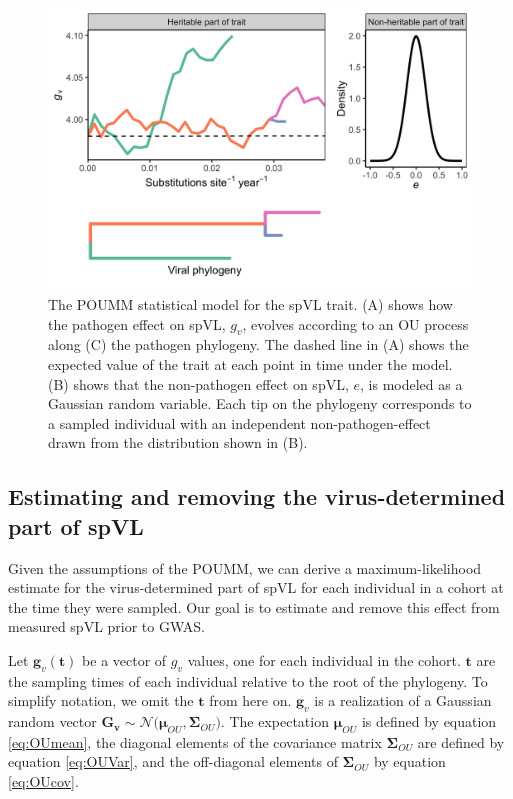 \documentclass[]{article}
\begin{document}
\begin{doublespace}
\begin{figure}[H]
	\begin{center}
		\includegraphics[width=0.75\linewidth]{figures/model_figure}
		\caption{The POUMM statistical model for the spVL trait. (A) shows how the pathogen effect on spVL, $g_v$, evolves according to an OU process along (C) the pathogen phylogeny. The dashed line in (A) shows the expected value of the trait at each point in time under the model. (B) shows that the non-pathogen effect on spVL, $e$, is modeled as a Gaussian random variable. Each tip on the phylogeny corresponds to a sampled individual with an independent non-pathogen-effect drawn from the distribution shown in (B).}
		\label{fig:spVLModel}
	\end{center}
\end{figure}

\subsection{Estimating and removing the virus-determined part of spVL}

Given the assumptions of the POUMM, we can derive a maximum-likelihood estimate for the virus-determined part of spVL for each individual in a cohort at the time they were sampled. Our goal is to estimate and remove this effect from measured spVL prior to GWAS. 

Let $\bm{g}_v(\bm{t})$ be a vector of $g_v$ values, one for each individual in the cohort. $\bm{t}$ are the sampling times of each individual relative to the root of the phylogeny. To simplify notation, we omit the $\bm{t}$ from here on. $\bm{g}_v$ is a realization of a Gaussian random vector $\bm{G_v} \sim \mathcal{N}\big(\bm{\mu}_{OU}, \boldsymbol{\Sigma}_{OU}\big)$. The expectation $\bm{\mu}_{OU}$ is defined by equation \ref{eq:OUmean}, the diagonal elements of the covariance matrix $\boldsymbol{\Sigma}_{OU}$ are defined by equation \ref{eq:OUVar}, and the off-diagonal elements of $\boldsymbol{\Sigma}_{OU}$ by equation \ref{eq:OUcov}. 


\end{doublespace}
\end{document}
